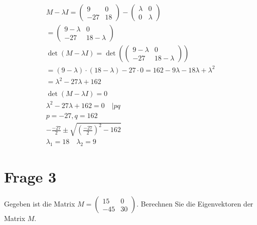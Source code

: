 \begin{align*}
    M - \lambda I = \begin{pmatrix}
                        9 & 0 \\ -27 & 18
                    \end{pmatrix} - \begin{pmatrix}
                                        \lambda & 0       \\
                                        0       & \lambda
                                    \end{pmatrix}                                        \\
    = \begin{pmatrix}
          9 - \lambda & 0 \\ -27 & 18 - \lambda
      \end{pmatrix}                                                   \\
    \det\left(M - \lambda I\right) = \det\left(\begin{pmatrix}
                                                       9 - \lambda & 0 \\ -27 & 18 - \lambda
                                                   \end{pmatrix}\right)          \\
    = (9 - \lambda) \cdot (18 - \lambda) - 27 \cdot 0 = 162 - 9\lambda -18\lambda +\lambda^2 \\
    = \lambda^2 -27\lambda + 162                                                             \\\\
    \det(M - \lambda I) = 0                                                                  \\
    \lambda^2 - 27\lambda + 162 = 0 \quad | pq                                               \\
    p = -27, q = 162                                                                         \\
    -\frac{-27}{2} \pm \sqrt{{\left(\frac{-27}{2}\right)}^2 - 162}                           \\
    \lambda_{1} = 18 \quad \lambda_{2} = 9
\end{align*}

\section{Frage 3}

Gegeben ist die Matrix $M = \begin{pmatrix}
        15 & 0 \\ -45 & 30
    \end{pmatrix}$. Berechnen Sie die Eigenvektoren der Matrix $M$.

